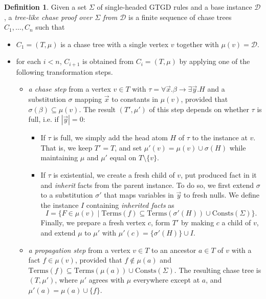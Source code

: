 \documentclass[12pt]{report}
\theoremstyle{plain}
\theoremstyle{definition}
\newtheorem{definition}[theorem]{Definition}
\def\Consts{{\mathrm{Consts}}}
\def\Terms{{\mathrm{Terms}}}
\begin{document}
\begin{definition}
\label{tree-like-chase-proof}
  Given a set $\Sigma$ of single-headed GTGD rules and a base instance $\mathcal{D}$, a \emph{tree-like chase proof over $\Sigma$ from $\mathcal{D}$} is a finite sequence of chase trees $C_1, \ldots, C_n$ such that
  \begin{itemize}
    \item $C_1 = (T, \mu)$ is a chase tree with a single vertex $v$ together with $\mu(v) = \mathcal{D}$.
    \item for each $i < n$, $C_{i + 1}$ is obtained from $C_i = (T, \mu)$ by applying one of the following transformation steps.
    \begin{itemize}
      \item \emph{a chase step} from a vertex $v \in T$ with $\tau = \forall \vec{x}. \beta \rightarrow \exists \vec{y}. H$ and a substitution $\sigma$ mapping $\vec{x}$ to constants in $\mu(v)$, provided that $\sigma(\beta) \subseteq \mu(v)$. The result $(T', \mu')$ of this step depends on whether $\tau$ is full, i.e. if $|\vec{y}| = 0$:
      \begin{itemize}
        \item If $\tau$ is full, we simply add the head atom $H$ of $\tau$ to the instance at $v$. That is, we keep $T' = T$, and set $\mu'(v) = \mu(v) \cup \sigma(H)$ while maintaining $\mu$ and $\mu'$ equal on $T \setminus \{v\}$.
        \item If $\tau$ is existential, we create a fresh child of $v$, put produced fact in it and \emph{inherit} facts from the parent instance. To do so, we first extend $\sigma$ to a substitution $\sigma'$ that maps variables in $\vec{y}$ to fresh nulls. We define the instance $I$ containing \emph{inherited facts} as $$I = \{ F \in \mu(v) \mid \Terms(f) \subseteq \Terms(\sigma'(H)) \cup \Consts(\Sigma) \}.$$ Finally, we prepare a fresh vertex $c$, form $T'$ by making $c$ a child of $v$, and extend $\mu$ to $\mu'$ with $\mu'(c) = \{\sigma'(H)\} \cup I$.
      \end{itemize}
      \item \emph{a propagation step} from a vertex $v \in T$ to an ancestor $a \in T$ of $v$ with a fact $f \in \mu(v)$, provided that $f \not\in \mu(a)$ and $\Terms(f) \subseteq \Terms(\mu(a)) \cup \Consts(\Sigma)$. The resulting chase tree is $(T, \mu')$, where $\mu'$ agrees with $\mu$ everywhere except at $a$, and $\mu'(a) = \mu(a) \cup \{f\}$.
    \end{itemize}
  \end{itemize}
\end{definition}
\end{document}
